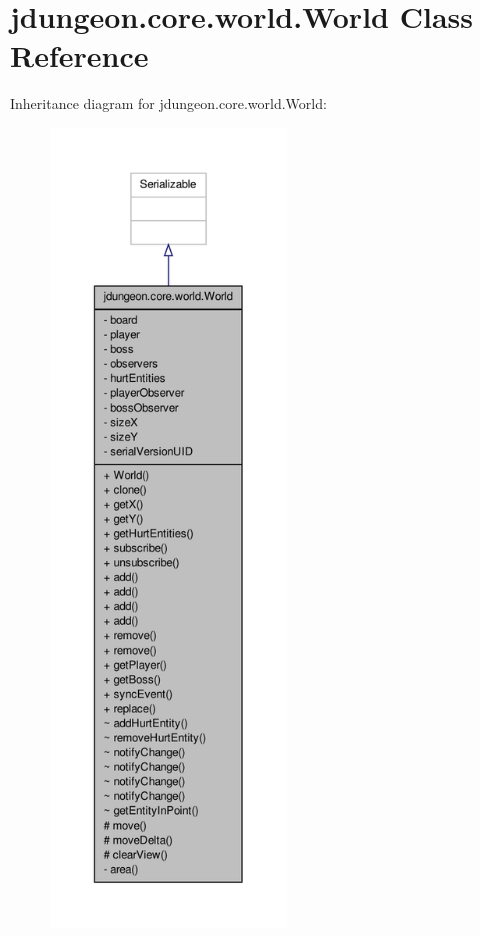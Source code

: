 \hypertarget{classjdungeon_1_1core_1_1world_1_1_world}{
\section{jdungeon.core.world.World Class Reference}
\label{classjdungeon_1_1core_1_1world_1_1_world}
}


Inheritance diagram for jdungeon.core.world.World:
\nopagebreak
\begin{figure}[H]
\begin{center}
\leavevmode
\includegraphics[height=600pt]{classjdungeon_1_1core_1_1world_1_1_world__inherit__graph}
\end{center}
\end{figure}


